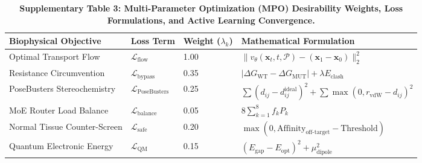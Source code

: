 \documentclass[11pt,a4paper]{article}
\begin{document}
\vspace{1em}

\begin{table}[h!]
\caption{\textbf{Supplementary Table 3: Multi-Parameter Optimization (MPO) Desirability Weights, Loss Formulations, and Active Learning Convergence.}}
\label{tab:supp_mpo}
\centering
\small
\begin{tabular}{llll}
\toprule
\textbf{Biophysical Objective} & \textbf{Loss Term} & \textbf{Weight ($\lambda_k$)} & \textbf{Mathematical Formulation} \\
\midrule
Optimal Transport Flow & $\mathcal{L}_{\text{flow}}$ & 1.00 & $\|v_\theta(\mathbf{x}_t, t, \mathcal{P}) - (\mathbf{x}_1 - \mathbf{x}_0)\|_2^2$ \\
Resistance Circumvention & $\mathcal{L}_{\text{bypass}}$ & 0.35 & $|\Delta G_{\text{WT}} - \Delta G_{\text{MUT}}| + \lambda E_{\text{clash}}$ \\
PoseBusters Stereochemistry & $\mathcal{L}_{\text{PoseBusters}}$ & 0.25 & $\sum (d_{ij} - d_{ij}^{\text{ideal}})^2 + \sum \max(0, r_{\text{vdW}} - d_{ij})^2$ \\
MoE Router Load Balance & $\mathcal{L}_{\text{balance}}$ & 0.05 & $8 \sum_{k=1}^8 f_k P_k$ \\
Normal Tissue Counter-Screen & $\mathcal{L}_{\text{safe}}$ & 0.20 & $\max(0, \text{Affinity}_{\text{off-target}} - \text{Threshold})$ \\
Quantum Electronic Energy & $\mathcal{L}_{\text{QM}}$ & 0.15 & $(E_{\text{gap}} - E_{\text{opt}})^2 + \mu_{\text{dipole}}^2$ \\
\bottomrule
\end{tabular}
\end{table}

\vspace{1em}
\end{document}
